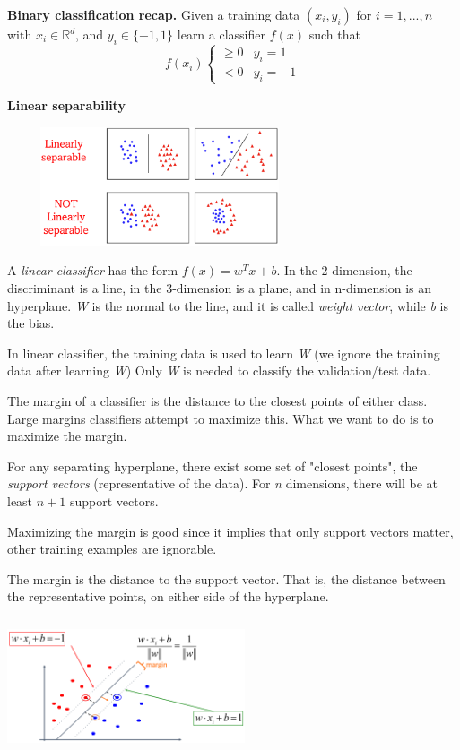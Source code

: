 \documentclass{article}
\begin{document}
\textbf{Binary classification recap. }Given a training data \((x_i, y_i)\) for \(i=1, ..., n\) with \(x_i \in \mathbb{R}^d\), and \(y_i \in \{-1, 1\}\) learn a classifier \(f(x)\) such that
\[f(x_i) \left\{\begin{array}{ll}
\geq 0 & y_i = 1\\
< 0 & y_i = -1
\end{array}\right.\]

\bigskip

\textbf{Linear separability}

\centering\includegraphics[width=9cm, height=3.5cm]{img/lin_class.png}	


\raggedright A \emph{linear classifier} has the form \(f(x) = w^Tx+b\). In the 2-dimension, the discriminant is a line, in the 3-dimension is a plane, and in n-dimension is an hyperplane. \emph{W} is the normal to the line, and it is called \emph{weight vector}, while \emph{b} is the bias.

In linear classifier, the training data is used to learn \emph{W} (we ignore the training data after learning \emph{W}) Only \emph{W} is needed to classify the validation/test data. 




The margin of a classifier is the distance to the closest points of either class. Large margins classifiers attempt to maximize this. What we want to do is to maximize the margin.

For any separating hyperplane, there exist some set of "closest points", the \emph{support vectors} (representative of the data). For \emph{n} dimensions, there will be at least \(n+1\) support vectors.

Maximizing the margin is good since it implies that only support vectors matter, other training examples are ignorable.

\bigskip
\begin{minipage}{0.45\linewidth}
The margin is the distance to the support vector. That is, the distance between the representative points, on either side of the hyperplane.
\end{minipage}
\hfill
\begin{minipage}{0.45\linewidth}
	\includegraphics[width=7cm, height=4cm]{img/margins.png}	
\end{minipage}
\end{document}
